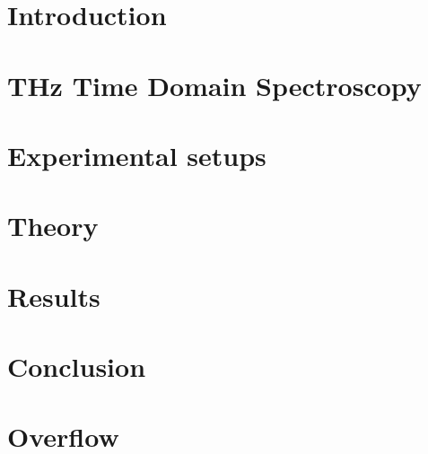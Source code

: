 \documentclass[12pt, a4paper]{report}
\begin{document}
\chapter{Introduction}

\chapter{THz Time Domain Spectroscopy}

\chapter{Experimental setups}

\chapter{Theory}

\chapter{Results}

\chapter{Conclusion}

\appendix
\chapter{Overflow}

\sloppy
\printbibliography %

\end{document}
